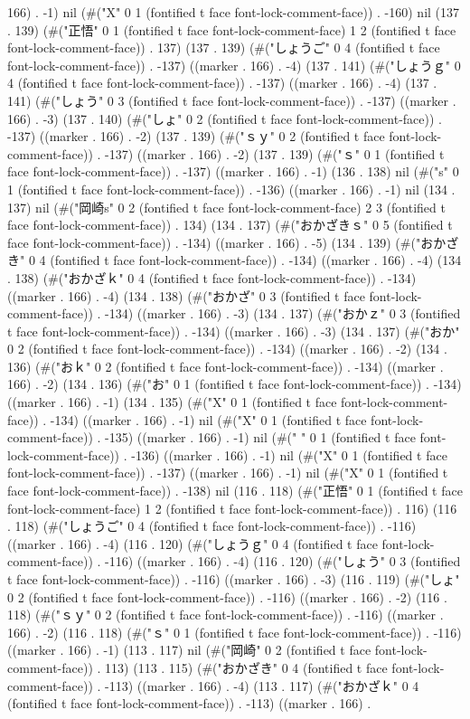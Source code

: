 166) . -1) nil (#("X" 0 1 (fontified t face font-lock-comment-face)) . -160) nil (137 . 139) (#("正悟" 0 1 (fontified t face font-lock-comment-face) 1 2 (fontified t face font-lock-comment-face)) . 137) (137 . 139) (#("しょうご" 0 4 (fontified t face font-lock-comment-face)) . -137) ((marker . 166) . -4) (137 . 141) (#("しょうｇ" 0 4 (fontified t face font-lock-comment-face)) . -137) ((marker . 166) . -4) (137 . 141) (#("しょう" 0 3 (fontified t face font-lock-comment-face)) . -137) ((marker . 166) . -3) (137 . 140) (#("しょ" 0 2 (fontified t face font-lock-comment-face)) . -137) ((marker . 166) . -2) (137 . 139) (#("ｓｙ" 0 2 (fontified t face font-lock-comment-face)) . -137) ((marker . 166) . -2) (137 . 139) (#("ｓ" 0 1 (fontified t face font-lock-comment-face)) . -137) ((marker . 166) . -1) (136 . 138) nil (#("s" 0 1 (fontified t face font-lock-comment-face)) . -136) ((marker . 166) . -1) nil (134 . 137) nil (#("岡崎s" 0 2 (fontified t face font-lock-comment-face) 2 3 (fontified t face font-lock-comment-face)) . 134) (134 . 137) (#("おかざきｓ" 0 5 (fontified t face font-lock-comment-face)) . -134) ((marker . 166) . -5) (134 . 139) (#("おかざき" 0 4 (fontified t face font-lock-comment-face)) . -134) ((marker . 166) . -4) (134 . 138) (#("おかざｋ" 0 4 (fontified t face font-lock-comment-face)) . -134) ((marker . 166) . -4) (134 . 138) (#("おかざ" 0 3 (fontified t face font-lock-comment-face)) . -134) ((marker . 166) . -3) (134 . 137) (#("おかｚ" 0 3 (fontified t face font-lock-comment-face)) . -134) ((marker . 166) . -3) (134 . 137) (#("おか" 0 2 (fontified t face font-lock-comment-face)) . -134) ((marker . 166) . -2) (134 . 136) (#("おｋ" 0 2 (fontified t face font-lock-comment-face)) . -134) ((marker . 166) . -2) (134 . 136) (#("お" 0 1 (fontified t face font-lock-comment-face)) . -134) ((marker . 166) . -1) (134 . 135) (#("X" 0 1 (fontified t face font-lock-comment-face)) . -134) ((marker . 166) . -1) nil (#("X" 0 1 (fontified t face font-lock-comment-face)) . -135) ((marker . 166) . -1) nil (#(" " 0 1 (fontified t face font-lock-comment-face)) . -136) ((marker . 166) . -1) nil (#("X" 0 1 (fontified t face font-lock-comment-face)) . -137) ((marker . 166) . -1) nil (#("X" 0 1 (fontified t face font-lock-comment-face)) . -138) nil (116 . 118) (#("正悟" 0 1 (fontified t face font-lock-comment-face) 1 2 (fontified t face font-lock-comment-face)) . 116) (116 . 118) (#("しょうご" 0 4 (fontified t face font-lock-comment-face)) . -116) ((marker . 166) . -4) (116 . 120) (#("しょうｇ" 0 4 (fontified t face font-lock-comment-face)) . -116) ((marker . 166) . -4) (116 . 120) (#("しょう" 0 3 (fontified t face font-lock-comment-face)) . -116) ((marker . 166) . -3) (116 . 119) (#("しょ" 0 2 (fontified t face font-lock-comment-face)) . -116) ((marker . 166) . -2) (116 . 118) (#("ｓｙ" 0 2 (fontified t face font-lock-comment-face)) . -116) ((marker . 166) . -2) (116 . 118) (#("ｓ" 0 1 (fontified t face font-lock-comment-face)) . -116) ((marker . 166) . -1) (113 . 117) nil (#("岡崎" 0 2 (fontified t face font-lock-comment-face)) . 113) (113 . 115) (#("おかざき" 0 4 (fontified t face font-lock-comment-face)) . -113) ((marker . 166) . -4) (113 . 117) (#("おかざｋ" 0 4 (fontified t face font-lock-comment-face)) . -113) ((marker . 166) . 
